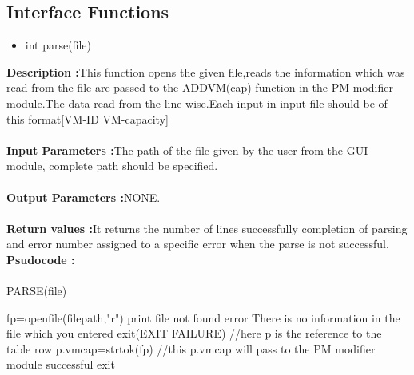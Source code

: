 \documentclass{article}
\begin{document}
\subsection{Interface Functions}
\begin{itemize}
\item int parse(file)
\end{itemize}
\textbf{Description :}This function opens the given file,reads the information which was read from the file are passed to the ADDVM(cap) function in the PM-modifier module.The data read from the line wise.Each input in input file should be of this format[VM-ID VM-capacity]\\
\\
\textbf{Input Parameters :}The path of the file given by the user from the GUI module, complete path should be specified.\\
\\
\textbf{Output Parameters :}NONE.\\
\\
\textbf{Return values :}It returns the number of lines successfully completion of parsing and error number assigned to a specific error when the parse is not successful.
\pagebreak
\\
\textbf{Psudocode :}\\
\\
PARSE(file)
\begin{algorithmic}[1]
\STATE fp=openfile(filepath,"r")
\STATE print file not found error
\ELSE
{}
\STATE There is no information in the file which you entered
\ENDIF
\ENDIF
\STATE exit(EXIT FAILURE)
\STATE //here p is the reference to the table row
\STATE p.vmcap=strtok(fp)
\STATE //this p.vmcap will pass to the PM modifier module
\ENDWHILE
\STATE successful exit
\end{algorithmic}
\end{document}
